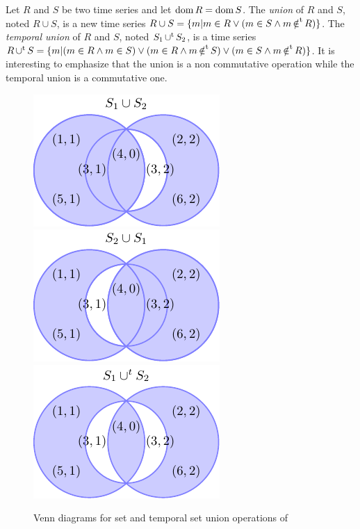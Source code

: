Let $R$ and $S$ be two time series and let $\operatorname{dom} R =\operatorname{dom} S$. 
%
The \emph{union} of $R$ and $S$, noted $R\cup S$, is a new time series
$R \cup S = \{m|m\in R\vee (m\in S\wedge m \operatorname*{\notin^t} R)\}$. 
%
The \emph{temporal union} of $R$ and $S$, noted $S_1 \operatorname*{\cup^t} S_2$, is a
time series $R \operatorname*{\cup^t} S = \{ m | (m \in R \wedge m \in S) \vee (m \in R
\wedge m \operatorname*{\notin^t} S) \vee (m \in S \wedge m \operatorname*{\notin^t} R) \}$.  
%
%
It is interesting to emphasize that the union is a non commutative
operation while the temporal union is a commutative one.

\begin{figure}
  \centering
  \includegraphics{fig_model_venn.pdf}
  \includegraphics{fig_model_venn_reverse.pdf}
  \includegraphics{fig_model_venn2.pdf}
  \caption{Venn diagrams for set and temporal set union operations of
    }
  \label{fig:model:venn}
\end{figure}


